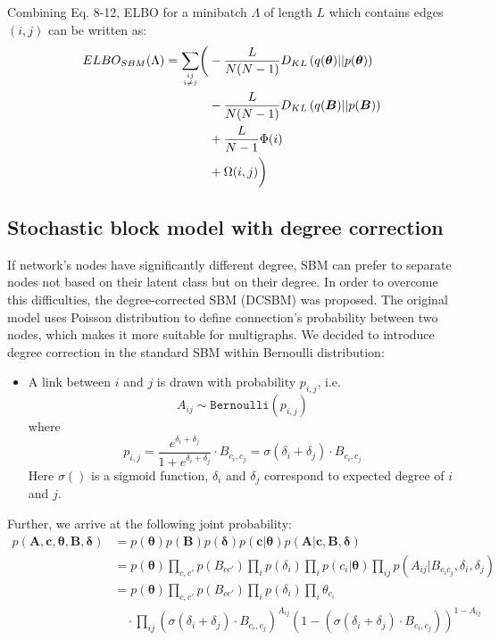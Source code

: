 \documentclass{article}
\renewcommand{\v}[1]{\bm{#1}}
\begin{document}
Combining Eq. 8-12, ELBO for a minibatch $\Lambda$ of length $L$ which contains edges $(i,j)$ can be written as:
\begin{equation}
\begin{split}
ELBO_{SBM}(\Lambda) = \sum_{ij \atop i \neq j} \biggl( &- \frac{L}{N (N - 1)} D_{KL} \left(q(\v{\theta})||p(\v{\theta})\right)\\
\quad &- \frac{L}{N (N - 1)} D_{KL}\left(q(\v{B})||p(\v{B})\right) \\
\quad &+ \frac{L}{N - 1}\Phi(i)\\
\quad &+ \Omega(i,j)   \biggr)
\end{split}
\end{equation} 


\subsection{Stochastic block model with degree correction}
If network's nodes have significantly different degree, SBM can prefer to separate nodes not based on their latent class but on their degree. In order to overcome this difficulties, the degree-corrected SBM (DCSBM) was proposed. The original model \cite{bibid} uses Poisson distribution to define connection's probability between two nodes, which makes it more suitable for multigraphs. We decided to introduce degree correction in the standard SBM within Bernoulli distribution:
\begin{itemize}
	\item A link between $i$ and $j$ is drawn with probability $p_{i,j}$, i.e.
	\[ A_{ij} \sim \mathtt{Bernoulli}(p_{i,j}) \]
	where 
	\[ p_{i,j} = \frac{e^{\delta_i + \delta_j}}{1 + e^{\delta_i + \delta_j}} \cdot B_{c_i,c_j} 
	 = \sigma(\delta_i + \delta_j) \cdot B_{c_i,c_j}\]
	Here $\sigma()$ is a sigmoid function, $\delta_i$ and $\delta_j$ correspond to expected degree of $i$ and $j$.
\end{itemize}
Further, we arrive at the following joint probability:
\begin{equation}
\begin{split}
p(\v{A}, \v{c}, \v{\theta}, \v{B}, \v{\delta})
&= p(\v{\theta}) p(\v{B}) p(\v{\delta}) p( \v{c} | \v{\theta} ) p( \v{A} | \v{c}, \v{B}, \v{\delta} ) \\
&= p(\v{\theta}) \prod_{c,c'} p(B_{c c'}) \prod_{i} p(\delta_i) \prod_i p(c_i | \v{\theta}) \prod_{ij} p(A_{ij} | B_{c_i c_j}, \delta_i, \delta_j) \\
&= p(\v{\theta}) \prod_{c,c'} p(B_{c c'}) \prod_{i} p(\delta_i) \prod_i \theta_{c_i}\\
& \quad \cdot \prod_{ij} (\sigma(\delta_i + \delta_j) \cdot B_{c_i,c_j})^{A_{ij}} (1 - (\sigma(\delta_i + \delta_j) \cdot B_{c_i,c_j}))^{1 - {A_{ij}}} \\
\end{split}
\end{equation}
\end{document}
